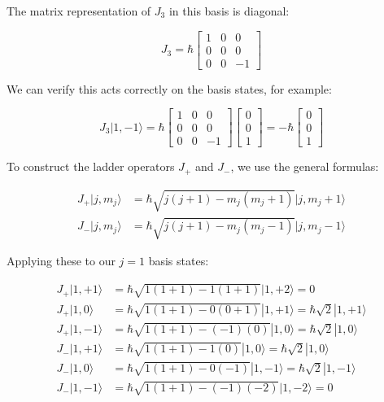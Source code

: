 \documentclass[italian]{HKNdocument}
\begin{document}
The matrix representation of $J_3$ in this basis is diagonal:

\[
J_{3}=\hbar\left[\begin{array}{ccc}
1 & 0 & 0  \\
0 & 0 & 0 \\
0 & 0 & -1
\end{array}\right]
\]

We can verify this acts correctly on the basis states, for example:

\[
J_{3}|1,-1\rangle=\hbar\left[\begin{array}{ccc}
1 & 0 & 0  \\
0 & 0 & 0 \\
0 & 0 & -1
\end{array}\right]\left[\begin{array}{l}
0 \\
0 \\
1
\end{array}\right]=-\hbar\left[\begin{array}{l}
0 \\
0 \\
1
\end{array}\right]
\]

To construct the ladder operators $J_+$ and $J_-$, we use the general formulas:

\begin{align}
J_{+}|j,m_j\rangle &= \hbar\sqrt{j(j+1)-m_j(m_j+1)}|j,m_j+1\rangle  \\
J_{-}|j,m_j\rangle &= \hbar\sqrt{j(j+1)-m_j(m_j-1)}|j,m_j-1\rangle
\end{align}

Applying these to our $j=1$ basis states:

\begin{align}
J_{+}|1,+1\rangle &= \hbar\sqrt{1(1+1)-1(1+1)}|1,+2\rangle=0 \\
J_{+}|1,0\rangle &= \hbar\sqrt{1(1+1)-0(0+1)}|1,+1\rangle=\hbar\sqrt{2}|1,+1\rangle \\
J_{+}|1,-1\rangle &= \hbar\sqrt{1(1+1)-(-1)(0)}|1,0\rangle=\hbar\sqrt{2}|1,0\rangle \\
J_{-}|1,+1\rangle &= \hbar\sqrt{1(1+1)-1(0)}|1,0\rangle=\hbar\sqrt{2}|1,0\rangle  \\
J_{-}|1,0\rangle &= \hbar\sqrt{1(1+1)-0(-1)}|1,-1\rangle=\hbar\sqrt{2}|1,-1\rangle \\
J_{-}|1,-1\rangle &= \hbar\sqrt{1(1+1)-(-1)(-2)}|1,-2\rangle=0
\end{align}
\end{document}
